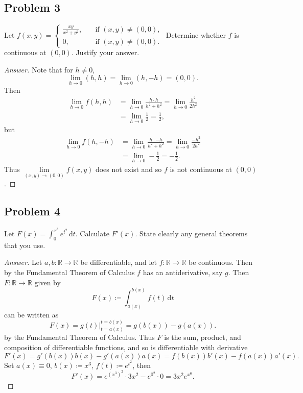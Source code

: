 \documentclass[12pt]{article}
\newcommand{\real}{\mathbb{R}}
\newcommand\paren[1]{\left( #1 \right)}
\theoremstyle{definition}
\begin{document}
\subsection{Problem 3}
Let $ \displaystyle f(x,y) = 
\begin{cases} \frac{xy}{x^2 + y^2} , & \quad \text{if } (x,y) \neq (0,0), \\ 0 , & \quad \text{if } (x,y) \neq (0,0).
\end{cases}$ Determine whether $f$ is continuous at $(0,0)$. Justify your answer.
\begin{proof}[Answer]
    Note that for $h \neq 0$, 
    \[
        \lim\limits_{h \to 0} (h,h) = \lim\limits_{h \to 0} (h,-h) = (0,0).
    \]
    Then 
    \begin{align*}
        \lim\limits_{h \to 0} f(h,h) & = \lim\limits_{h \to 0} \frac{h\cdot h}{h^2 + h^2} = \lim\limits_{h \to 0} \frac{h^2}{2h^2} \\
        & = \lim\limits_{h \to 0} \frac{1}{2} = \frac{1}{2},
    \end{align*}
    but 
    \begin{align*}
        \lim\limits_{h \to 0} f(h,-h) & = \lim\limits_{h \to 0} \frac{h\cdot -h}{h^2 + h^2}  = \lim\limits_{h \to 0} \frac{-h^2}{2h^2} \\
        & = \lim\limits_{h \to 0} -\frac{1}{2} = -\frac{1}{2}.
    \end{align*}
    Thus $\lim\limits_{(x,y) \to (0,0)} f(x,y)$ does not exist and so $f$ is not continuous at $(0,0)$.
\end{proof}
\subsection{Problem 4}
Let $\displaystyle F(x) = \int_0^{x^3} e^{t^2} \, \mathrm{d}t$. Calculate $F'(x)$. State clearly any general theorems that you use.
\begin{proof}[Answer]
    Let $a,b : \real \to \real$ be differentiable, and let $f : \real \to \real$ be continuous. Then by the Fundamental Theorem of Calculus $f$ has an antiderivative, say $g$. Then $F : \real \to \real$ given by 
    \[
        F(x) \coloneqq \int_{a(x)}^{b(x)} f(t) \, \mathrm{d}t
    \]
    can be written as 
    \[
        F(x) = g(t) \Big|_{t = a(x)}^{t = b(x)} = g \paren{ b(x) } - g \paren{ a(x) }.
    \]
    by the Fundamental Theorem of Calculus. Thus $F$ is the sum, product, and composition of differentiable functions, and so is differentiable with derivative 
    \[
        F'(x) = g' \paren{ b(x) } b(x) - g' \paren{ a(x) } a(x) = f \paren{ b(x) } b'(x) - f \paren{ a(x) } a'(x).
    \]
    Set $a(x) \equiv 0$, $b(x) \coloneqq x^3$, $f(t) \coloneqq e^{t^2}$, then 
    \[
        F'(x) =e^{ \paren{ x^3 }^2 } \cdot 3x^2 - e^{0^2} \cdot 0 = \boxed{ 3x^2 e^{x^6}. }
    \]
\end{proof}
\end{document}
